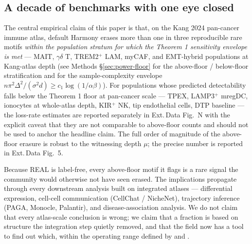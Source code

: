 
\subsection{A decade of benchmarks with one eye closed}

The central empirical claim of this paper is that, on the Kang 2024 pan-cancer immune atlas, default Harmony erases more than one in three reproducible rare motifs \emph{within the population stratum for which the Theorem 1 sensitivity envelope is met} --- MAIT, $\gamma\delta$ T, TREM2$^+$ LAM, myCAF, and EMT-hybrid populations at Kang-atlas depth (see Methods \S\ref{sec:power-floor} for the above-floor / below-floor stratification and  for the sample-complexity envelope $n\pi^2\Delta^2/(\sigma^2 d) \ge c_1 \log(1/\alpha\beta)$). For populations whose predicted detectability falls below the Theorem 1 floor at pan-cancer scale --- TPEX, LAMP3$^+$ mregDC, ionocytes at whole-atlas depth, KIR$^+$ NK, tip endothelial cells, DTP baseline --- the loss-rate estimates are reported separately in Ext.\,Data Fig.~N with the explicit caveat that they are not comparable to above-floor counts and should not be used to anchor the headline claim. The full order of magnitude of the above-floor erasure is robust to the witnessing depth $\mu$; the precise number is reported in Ext.\,Data Fig.~5.

Because REAL is label-free, every above-floor motif it flags is a rare signal the community would otherwise not have seen erased. The implications propagate through every downstream analysis built on integrated atlases --- differential expression, cell-cell communication (CellChat / NicheNet), trajectory inference (PAGA, Monocle, Palantir), and disease-association analysis. We do not claim that every atlas-scale conclusion is wrong; we claim that a fraction is based on structure the integration step quietly removed, and that the field now has a tool to find out which, within the operating range defined by  and .
